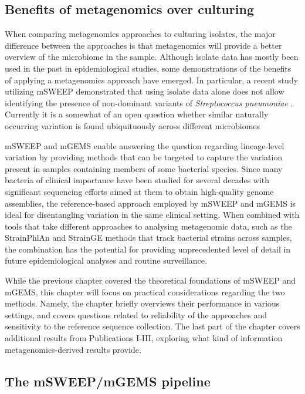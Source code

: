\documentclass[officiallayout]{tktla}
\begin{document}
\subsection{Benefits of metagenomics over culturing}

When comparing metagenomics approaches to culturing isolates, the
major difference between the approaches is that metagenomics will
provide a better overview of the microbiome in the sample. Although
isolate data has mostly been used in the past in epidemiological
studies, some demonstrations of the benefits of applying a
metagenomics approach have emerged. In particular, a recent study
utilizing mSWEEP demonstrated that using isolate data alone does not
allow identifying the presence of non-dominant variants of
\textit{Streptococcus pneumoniae}
\citep{tonkin-hill_pneumococcal_2022}. Currently it is a somewhat of
an open question whether similar naturally occurring variation is
found ubiquituously across different microbiomes

mSWEEP and mGEMS enable answering the question regarding lineage-level
variation by providing methods that can be targeted to capture the
variation present in samples containing members of some bacterial
species. Since many bacteria of clinical importance have been studied
for several decades with significant sequencing efforts aimed at them
to obtain high-quality genome assemblies, the reference-based approach
employed by mSWEEP and mGEMS is ideal for disentangling variation in
the same clinical setting. When combined with tools that take
different approaches to analysing metagenomic data, such as the
StrainPhlAn \citep{truong2017microbial} and StrainGE
\citep{van2022strainge} methods that track bacterial strains across
samples, the combination has the potential for providing unprecedented
level of detail in future epidemiological analyses and routine
surveillance.

While the previous chapter covered the theoretical foundations of
mSWEEP and mGEMS, this chapter will focus on practical considerations
regarding the two methods. Namely, the chapter briefly overviews their
performance in various settings, and covers questions related to
reliability of the approaches and sensitivity to the reference
sequence collection. The last part of the chapter covers additional
results from Publications I-III, exploring what kind of information
metagenomics-derived results provide.

\subsection{The mSWEEP/mGEMS pipeline}
\end{document}
